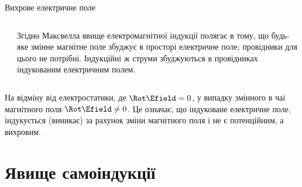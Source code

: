 \documentclass[onlytextwidth]{beamer}
\begin{document}
\begin{frame}{Вихрове електричне поле}{}
\begin{onlyenv}
\begin{columns}
\begin{column}{0.4\linewidth}
			\end{column}
			\begin{column}{0.6\linewidth}
				\begin{block}{}\justifying\small
					Згідно  Максвелла \alert{явище електромагнітної індукції} полягає в тому, що будь-яке змінне магнітне поле збуджує в просторі
					електричне поле; провідники для цього не потрібні. Індукційні ж струми збуджуються в провідниках індукованим електричним полем.
				\end{block}
			\end{column}
		\end{columns}
		\begin{block}{}\justifying\small
			На відміну від електростатики, де $\Rot\Efield = 0$, у випадку змінного в чаі магнітного поля $ \Rot\Efield \neq 0$. Це означає, що
			індуковане
			електричне поле, індукується (виникає) за рахунок зміни магнітного поля і не є потенційним, а вихровим.
		\end{block}
	\end{onlyenv}
\end{frame}



\section{Явище самоіндукції}
\end{document}
